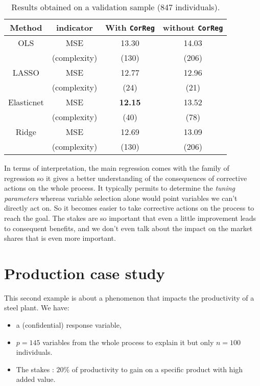 \documentclass[12pt,a4paper]{report}
\begin{document}
		\begin{table}[h!]
\centering
\begin{tabular}{|c c|c|c|}
	\hline 
	Method& indicator& With {\tt CorReg} & without {\tt CorReg} \\ 
	\hline 
	OLS & MSE & 13.30 & 14.03 \\
		& (complexity)& (130) & (206) \\
	\hline
	LASSO & MSE & 12.77 & 12.96 \\
		& (complexity)& (24) & (21) \\
	\hline
	Elasticnet & MSE & \textbf{12.15} & 13.52 \\
		& (complexity)& (40) & (78) \\
	\hline
	Ridge & MSE & 12.69 & 13.09 \\
		& (complexity)& (130) & (206) \\
	\hline
\end{tabular} 
\caption{Results obtained on a validation sample (847 individuals).}\label{Res_exfos}
\end{table}


		In terms of interpretation, the main regression comes with the family of regression so it gives a better understanding of the consequences of corrective actions on the whole process. It typically permits to determine the \textit{tuning parameters} whereas variable selection alone would point variables we can't directly act on.	So it becomes easier to take corrective actions on the process to reach the goal. The stakes are so important that even a little improvement leads to consequent benefits, and we don't even talk about the impact on the market shares that is even more important.
		\FloatBarrier
		\section{Production case study}\label{sectionBV}
This second example is about a phenomenon that impacts the productivity of a steel plant.
We have:
		\begin{itemize}
			\item a (confidential)  response variable,
			\item $p=145$ variables from the whole process to explain it but only $n=100$ individuals.
			\item The stakes : $20\%$ of productivity to gain on a specific product with high added value.
		\end{itemize}
		
\end{document}
